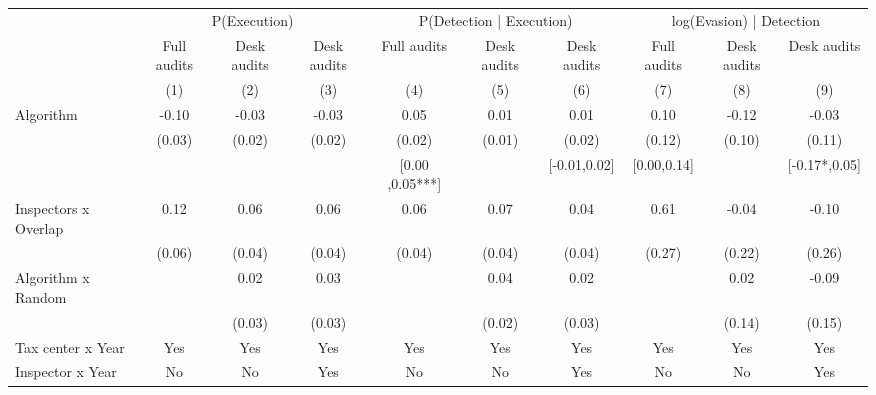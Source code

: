 \begin{tabular}{lccc|ccc|ccc} \toprule
\multicolumn{1}{l}{} & \multicolumn{3}{c}{P(Execution)} & \multicolumn{3}{c}{P(Detection | Execution)} & \multicolumn{3}{c}{log(Evasion) | Detection} \\\cmidrule(lr){2-4}\cmidrule(lr){5-7}\cmidrule(lr){8-10} \multicolumn{1}{l}{} & Full audits & Desk audits & Desk audits & Full audits & Desk audits & Desk audits & Full audits & Desk audits & Desk audits \\ \multicolumn{1}{l}{} & (1) & (2) & (3) & (4) & (5) & (6) & (7) & (8) & (9) \\ \midrule
Algorithm   &       -0.10\sym{***}&       -0.03\sym{*}  &       -0.03\sym{**} &        0.05\sym{**} &        0.01         &        0.01         &        0.10         &       -0.12         &       -0.03         \\
            &      (0.03)         &      (0.02)         &      (0.02)         &      (0.02)         &      (0.01)         &      (0.02)         &      (0.12)         &      (0.10)         &      (0.11)         \\
\addlinespace
 & & & & [0.00 ,0.05***] & & [-0.01,0.02] & [0.00,0.14] & & [-0.17*,0.05] \\  Inspectors x Overlap&        0.12\sym{*}  &        0.06\sym{*}  &        0.06         &        0.06\sym{*}  &        0.07\sym{**} &        0.04         &        0.61\sym{**} &       -0.04         &       -0.10         \\
            &      (0.06)         &      (0.04)         &      (0.04)         &      (0.04)         &      (0.04)         &      (0.04)         &      (0.27)         &      (0.22)         &      (0.26)         \\
\addlinespace
Algorithm x Random&                     &        0.02         &        0.03         &                     &        0.04\sym{*}  &        0.02         &                     &        0.02         &       -0.09         \\
            &                     &      (0.03)         &      (0.03)         &                     &      (0.02)         &      (0.03)         &                     &      (0.14)         &      (0.15)         \\
\midrule
Tax center x Year&         Yes         &         Yes         &         Yes         &         Yes         &         Yes         &         Yes         &         Yes         &         Yes         &         Yes         \\
Inspector x Year&          No         &          No         &         Yes         &          No         &          No         &         Yes         &          No         &          No         &         Yes         \\

\end{tabular}
